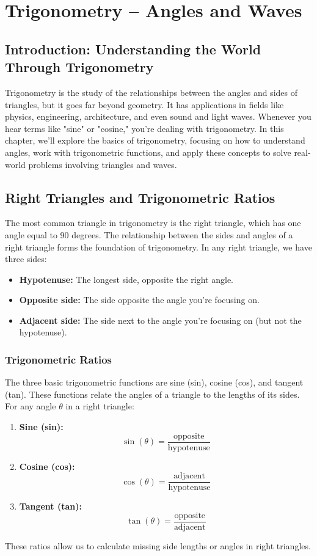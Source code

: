 \chapter{Trigonometry – Angles and Waves}

\section{Introduction: Understanding the World Through Trigonometry}
Trigonometry is the study of the relationships between the angles and sides of triangles, but it goes far beyond geometry. It has applications in fields like physics, engineering, architecture, and even sound and light waves. Whenever you hear terms like "sine" or "cosine," you're dealing with trigonometry.
In this chapter, we’ll explore the basics of trigonometry, focusing on how to understand angles, work with trigonometric functions, and apply these concepts to solve real-world problems involving triangles and waves.

\section{Right Triangles and Trigonometric Ratios}
The most common triangle in trigonometry is the right triangle, which has one angle equal to 90 degrees. The relationship between the sides and angles of a right triangle forms the foundation of trigonometry.
In any right triangle, we have three sides:
\begin{itemize}
    \item \textbf{Hypotenuse:} The longest side, opposite the right angle.
    \item \textbf{Opposite side:} The side opposite the angle you’re focusing on.
    \item \textbf{Adjacent side:} The side next to the angle you’re focusing on (but not the hypotenuse).
\end{itemize}

\subsection{Trigonometric Ratios}
The three basic trigonometric functions are sine (sin), cosine (cos), and tangent (tan). These functions relate the angles of a triangle to the lengths of its sides.
For any angle $\theta$ in a right triangle:
\begin{enumerate}
    \item \textbf{Sine (sin):}
    \[
    \sin(\theta) = \frac{\text{opposite}}{\text{hypotenuse}}
    \]
    \item \textbf{Cosine (cos):}
    \[
    \cos(\theta) = \frac{\text{adjacent}}{\text{hypotenuse}}
    \]
    \item \textbf{Tangent (tan):}
    \[
    \tan(\theta) = \frac{\text{opposite}}{\text{adjacent}}
    \]
\end{enumerate}
These ratios allow us to calculate missing side lengths or angles in right triangles.

